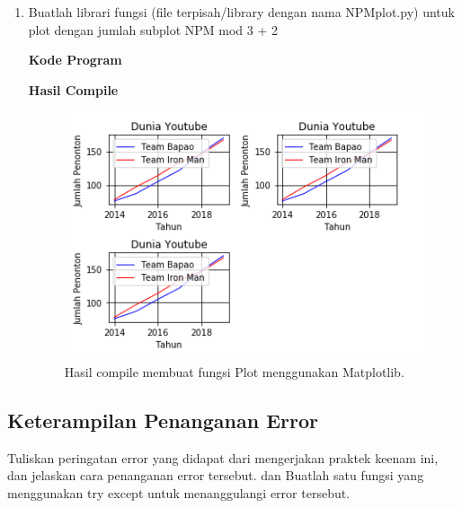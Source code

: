 \begin{enumerate}
		\item Buatlah librari fungsi (file terpisah/library dengan nama NPMplot.py) untuk plot dengan jumlah subplot NPM mod 3 + 2

			\hfill \break
			\textbf{Kode Program}

			

			\hfill \break
			\textbf{Hasil Compile}

			\begin{figure}[H]
				\includegraphics[width=12cm]{figures/chapter6/1174057/praktek4.png}
				\centering
				\caption{Hasil compile membuat fungsi Plot menggunakan Matplotlib.}
			\end{figure}	
	\end{enumerate}
	
	\subsection{Keterampilan Penanganan Error}
		Tuliskan  peringatan  error  yang  didapat  dari  mengerjakan  praktek  keenam  ini, dan  jelaskan  cara  penanganan  error  tersebut. dan  Buatlah  satu  fungsi  yang menggunakan try except untuk menanggulangi error tersebut.

